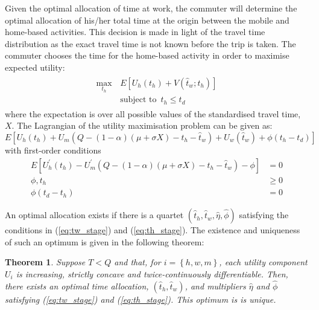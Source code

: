 \documentclass[12pt,a4paper,british]{article}
\newtheorem{theorem}{Theorem}[section]
\begin{document}
Given the optimal allocation of time at work, the commuter will determine the optimal allocation of his/her total time at the origin between the mobile and home-based activities. This decision is made in light of the travel time distribution as the exact travel time is not known before the trip is taken. The commuter chooses the time for the home-based activity in order to maximise expected utility:
\begin{align}
\begin{split}
\max_{t_{h}} \, & E\left[U_{h}\left(t_{h}\right)+V\left(\hat{t}_{w};t_{h}\right)\right]\\
& \mbox{subject to } \, t_{h} \leq t_{d}
\end{split}
\label{eq:firstStageProblem}
\end{align}
where the expectation is over all possible values of the standardised travel time, $X$. The Lagrangian of the utility maximisation problem can be given as: 
\begin{equation*}
E\left[U_{h}\left(t_{h}\right)+U_{m}\left(Q-\left(1-\alpha\right)\left(\mu+\sigma X\right)-t_{h}-\hat{t}_{w}\right)+U_{w}\left(\hat{t}_{w}\right)+\phi\left(t_{h}-t_{d}\right)\right]
\end{equation*}
with first-order conditions
\begin{subequations}\label{eq:th_stage}
\begin{align}
E\left[U_{h}^{\prime}\left(t_{h}\right)-U_{m}^{\prime}\left(Q-\left(1-\alpha\right)\left(\mu+\sigma X\right)-t_{h}-\hat{t}_{w}\right)-\phi\right] & =0
\label{eq:stage1_wrt_th}\\
\phi,t_{h} & \geq 0 
\label{eq:stage1_lambda}\\
\phi\left(t_{d}-t_{h}\right) & =0
\label{eq:stage1_lambdai_const}
\end{align}
\end{subequations}

An optimal allocation exists if there is a quartet $\left(\hat{t}_{h},\hat{t}_{w},\hat{\eta},\hat{\phi}\right)$ satisfying the conditions in (\ref{eq:tw_stage}) and (\ref{eq:th_stage}). The existence and uniqueness of such an optimum is given in the following theorem:
\begin{theorem}
\label{thm:existence_stochastic}Suppose $T<Q$ and that, for $i=\left\{ h,w,m\right\} $, each utility component $U_{i}$ is increasing, strictly concave and twice-continuously differentiable. Then, there exists an optimal time allocation, $\left(\hat{t}_{h},\hat{t}_{w}\right)$, and multipliers $\hat{\eta}$ and $\hat{\phi}$ satisfying (\ref{eq:tw_stage}) and (\ref{eq:th_stage}). This optimum is is unique.
\end{theorem}
\end{document}
